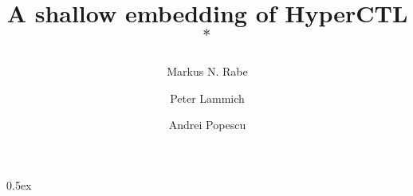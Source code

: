 \documentclass[11pt,a4paper]{article}
\begin{document}
\title{A shallow embedding of HyperCTL$^*$}
\author{Markus N. Rabe \and Peter Lammich \and Andrei Popescu}
\date{}
\maketitle

\tableofcontents

\parindent 0pt\parskip 0.5ex





%
%
\end{document}
